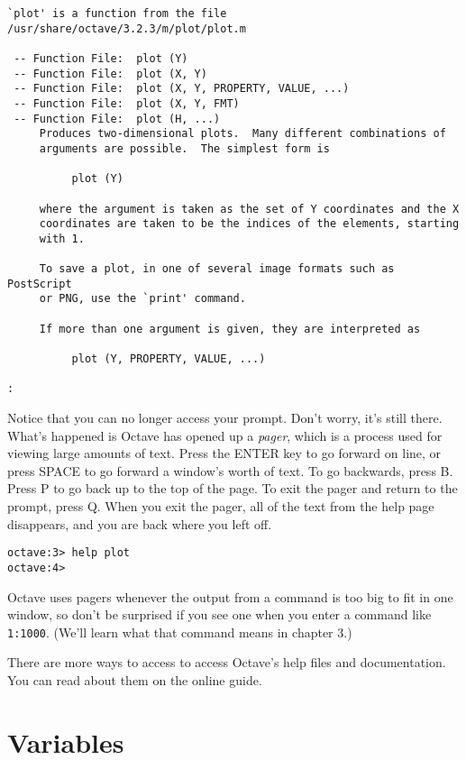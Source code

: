 \begin{verbatim}
`plot' is a function from the file /usr/share/octave/3.2.3/m/plot/plot.m

 -- Function File:  plot (Y)
 -- Function File:  plot (X, Y)
 -- Function File:  plot (X, Y, PROPERTY, VALUE, ...)
 -- Function File:  plot (X, Y, FMT)
 -- Function File:  plot (H, ...)
     Produces two-dimensional plots.  Many different combinations of
     arguments are possible.  The simplest form is

          plot (Y)

     where the argument is taken as the set of Y coordinates and the X
     coordinates are taken to be the indices of the elements, starting
     with 1.

     To save a plot, in one of several image formats such as PostScript
     or PNG, use the `print' command.

     If more than one argument is given, they are interpreted as

          plot (Y, PROPERTY, VALUE, ...)

:
\end{verbatim}

Notice that you can no longer access your prompt. Don't worry, it's still there.
What's happened is Octave has opened up a {\it pager}, which is a process used
for viewing large amounts of text. Press the ENTER key to go forward on
line, or press SPACE to go forward a window's worth of text. To go
backwards, press B. Press P to go back up to the top of the page.
To exit the pager and return to the prompt, press Q. When you exit the pager,
all of the text from the help page disappears, and you are back where you left
off.

\begin{verbatim}
octave:3> help plot
octave:4>
\end{verbatim}

Octave uses pagers whenever the output from a command is too big to fit in one
window, so don't be surprised if you see one when you enter a command like {\tt
1:1000}. (We'll learn what that command means in chapter 3.)

There are more ways to access to access Octave's help files and documentation.
You can read about them on the online guide.


\section{Variables}

